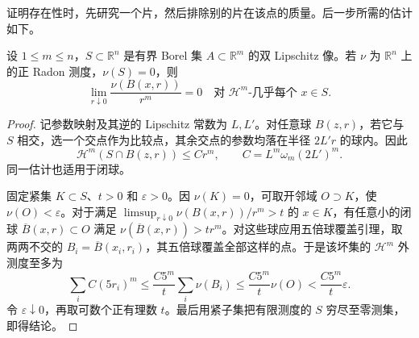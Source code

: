证明存在性时，先研究一个片，然后排除别的片在该点的质量。后一步所需的估计如下。

\begin{lemma}\label{g3:lem:off-sheet-density-zero}
	设 \(1\le m\le n\)，\(S\subset\mathbb R^n\) 是有界 Borel 集 \(A\subset\mathbb R^m\) 的双 Lipschitz 像。若 \(\nu\) 为 \(\mathbb R^n\) 上的正 Radon 测度，\(\nu(S)=0\)，则
	\[
		\lim_{r\downarrow0}\frac{\nu(B(x,r))}{r^m}=0
		\quad\text{对 }\mathcal H^m\text{-几乎每个 }x\in S.
	\]
\end{lemma}
\begin{proof}
	记参数映射及其逆的 Lipschitz 常数为 \(L,L'\)。对任意球 \(B(z,r)\)，若它与 \(S\) 相交，选一个交点作为比较点，其余交点的参数均落在半径 \(2L'r\) 的球内。因此
	\[
		\mathcal H^m(S\cap B(z,r))\le C r^m,
		\qquad C=L^m\omega_m(2L')^m.
	\]
	同一估计也适用于闭球。

	固定紧集 \(K\subset S\)、\(t>0\) 和 \(\varepsilon>0\)。因 \(\nu(K)=0\)，可取开邻域 \(O\supset K\)，使 \(\nu(O)<\varepsilon\)。对于满足
	\(\limsup_{r\downarrow0}\nu(B(x,r))/r^m>t\) 的 \(x\in K\)，有任意小的闭球 \(\overline B(x,r)\subset O\) 满足 \(\nu(\overline B(x,r))>tr^m\)。对这些球应用五倍球覆盖引理，取两两不交的 \(B_i=\overline B(x_i,r_i)\)，其五倍球覆盖全部这样的点。于是该坏集的 \(\mathcal H^m\) 外测度至多为
	\[
		\sum_i C(5r_i)^m
		\le\frac{C5^m}{t}\sum_i\nu(B_i)
		\le\frac{C5^m}{t}\nu(O)
		<\frac{C5^m}{t}\varepsilon.
	\]
	令 \(\varepsilon\downarrow0\)，再取可数个正有理数 \(t\)。最后用紧子集把有限测度的 \(S\) 穷尽至零测集，即得结论。
\end{proof}

